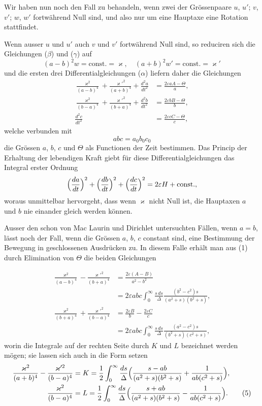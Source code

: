 \documentclass[12pt,a4paper]{article}
\begin{document}
Wir haben nun noch den Fall zu behandeln, wenn zwei der Gr\"ossenpaare $u$, $u'$; $v$, $v'$; $w$, $w'$ fortw\"ahrend Null sind, und also nur um eine Hauptaxe eine Rotation stattfindet.

Wenn ausser $u$ und $u'$ auch $v$ und $v'$ fortw\"ahrend Null sind, so reduciren sich die Gleichungen ($\beta$) und ($\gamma$) auf
\[
(a - b)^{2}w = \text{const.} = \varkappa,\quad (a + b)^{2}w' = \text{const.} = \varkappa'
\]
und die ersten drei Differentialgleichungen ($\alpha$) liefern daher die Gleichungen
\begin{align*}
\frac{\varkappa^{2}}{(a-b)^{4}} + \frac{\varkappa'^{2}}{(a+b)^{4}} + \frac{d^{2}a}{dt^{2}} &= \frac{2\varepsilon aA - \Theta}{a},\\
\frac{\varkappa^{2}}{(b-a)^{4}} + \frac{\varkappa'^{2}}{(b+a)^{4}} + \frac{d^{2}b}{dt^{2}} &= \frac{2\varepsilon bB - \Theta}{b},\\
\frac{d^{2}c}{dt^{2}} &= \frac{2\varepsilon cC - \Theta}{c},\tag{1}
\end{align*}
welche verbunden mit
\[
abc = a_{0}b_{0}c_{0}
\]
die Gr\"ossen $a$, $b$, $c$ und $\Theta$ als Functionen der Zeit bestimmen. Das Princip der Erhaltung der lebendigen Kraft giebt f\"ur diese Differentialgleichungen das Integral erster Ordnung
\[
\Bigl(\frac{da}{dt}\Bigr)^{2} + \Bigl(\frac{db}{dt}\Bigr)^{2} + \Bigl(\frac{dc}{dt}\Bigr)^{2} = 2\varepsilon H + \text{const.},
\]
woraus unmittelbar hervorgeht, dass wenn $\varkappa$ nicht Null ist, die Hauptaxen $a$ und $b$ nie einander gleich werden k\"onnen.

Ausser den schon von Mac Laurin und Dirichlet untersuchten F\"allen, wenn $a = b$, l\"asst noch der Fall, wenn die Gr\"ossen $a$, $b$, $c$ constant sind, eine Bestimmung der Bewegung in geschlossenen Ausdr\"ucken zu. In diesem Falle erh\"alt man aus (1) durch Elimination von $\Theta$ die beiden Gleichungen

\begin{align*}
\frac{\varkappa^{2}}{(a-b)^{4}} - \frac{\varkappa'^{2}}{(b+a)^{4}} &= \frac{2\varepsilon(A-B)}{a^{2}-b^{2}}\\
&= 2\varepsilon abc\int_{0}^{\infty}\frac{s\,ds}{\Delta}\frac{(b^{2}-c^{2})s}{(a^{2}+s)(b^{2}+s)},\\
\frac{\varkappa^{2}}{(b+a)^{4}} + \frac{\varkappa'^{2}}{(b-a)^{4}} &= \frac{2\varepsilon B}{b} - \frac{2\varepsilon C}{c}\\
&= 2\varepsilon abc\int_{0}^{\infty}\frac{s\,ds}{\Delta}\frac{(a^{2}-c^{2})s}{(b^{2}+s)(c^{2}+s)},\tag{3}
\end{align*}
worin die Integrale auf der rechten Seite durch $K$ und $L$ bezeichnet werden m\"ogen; sie lassen sich auch in die Form setzen
\begin{align*}
\frac{\varkappa^{2}}{(a+b)^{4}} - \frac{\varkappa'^{2}}{(b-a)^{4}} &= K = \frac{1}{2}\int_{0}^{\infty}\frac{ds}{\Delta}\Bigl(\frac{s - ab}{(a^{2}+s)(b^{2}+s)} + \frac{1}{ab(c^{2}+s)}\Bigr),\\
\frac{\varkappa^{2}}{(b-a)^{4}} &= L = \frac{1}{2}\int_{0}^{\infty}\frac{ds}{\Delta}\Bigl(\frac{s + ab}{(a^{2}+s)(b^{2}+s)} - \frac{1}{ab(c^{2}+s)}\Bigr).\tag{5}
\end{align*}
\end{document}
